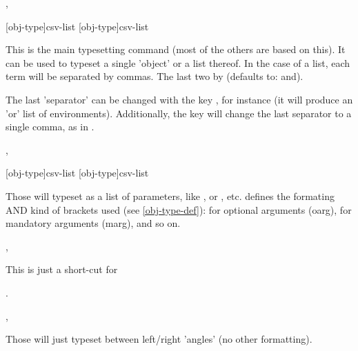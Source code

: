 \documentclass{article}
\begin{document}
\begin{codedescribe}[code]{\typesetobj,\tsobj}
\begin{codesyntax}
\tsmacro{\typesetobj}[obj-type]{csv-list}
\tsmacro{\tsobj}[obj-type]{csv-list}
\end{codesyntax}
This is the main typesetting command (most of the others are based on this). It can be used to typeset a single 'object' or a list thereof. In the case of a list, each term will be separated by commas. The last two  by  (defaults to: and).
\end{codedescribe}
\begin{tsremark}
The last 'separator' can be changed with the key , for instance \tsverb[code]{\tsobj[env,sep=or] {}} (it will produce an 'or' list of environments). Additionally,  the key  will change the last separator to a single comma, as in .
\end{tsremark}

\begin{codedescribe}[code]{\typesetargs,\tsargs}
\begin{codesyntax}
\tsmacro{\typesetargs}[obj-type]{csv-list}
\tsmacro{\tsargs}[obj-type]{csv-list}
\end{codesyntax}
 Those will typeset  as a list of parameters, like , or , etc.  defines the formating AND kind of brackets used (see \ref{obj-type-def}): \tsverb{[]} for optional arguments (oarg), \tsverb{{}} for mandatory arguments (marg), and so on.
\end{codedescribe}


\begin{codedescribe}[code]{\typesetmacro,\tsmacro}
\begin{codesyntax}
\end{codesyntax}
This is just a short-cut for\par {}  .
\end{codedescribe}

\begin{codedescribe}[code]{\typesetmeta,\tsmeta}
\begin{codesyntax}
\end{codesyntax}
 Those will just typeset  between left/right 'angles' (no other formatting).
\end{codedescribe}
\end{document}
